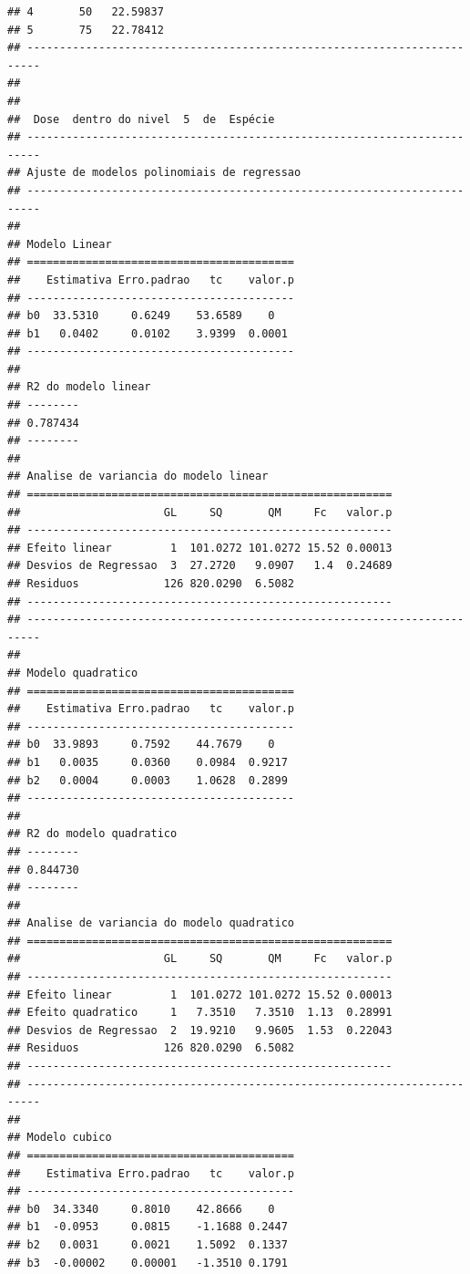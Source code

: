 \documentclass[
]{article}
\begin{document}
\begin{verbatim}
## 4       50   22.59837
## 5       75   22.78412
## ------------------------------------------------------------------------
## 
## 
##  Dose  dentro do nivel  5  de  Espécie 
## ------------------------------------------------------------------------
## Ajuste de modelos polinomiais de regressao
## ------------------------------------------------------------------------
## 
## Modelo Linear
## =========================================
##    Estimativa Erro.padrao   tc    valor.p
## -----------------------------------------
## b0  33.5310     0.6249    53.6589    0   
## b1   0.0402     0.0102    3.9399  0.0001 
## -----------------------------------------
## 
## R2 do modelo linear
## --------
## 0.787434
## --------
## 
## Analise de variancia do modelo linear
## ========================================================
##                      GL     SQ       QM     Fc   valor.p
## --------------------------------------------------------
## Efeito linear         1  101.0272 101.0272 15.52 0.00013
## Desvios de Regressao  3  27.2720   9.0907   1.4  0.24689
## Residuos             126 820.0290  6.5082               
## --------------------------------------------------------
## ------------------------------------------------------------------------
## 
## Modelo quadratico
## =========================================
##    Estimativa Erro.padrao   tc    valor.p
## -----------------------------------------
## b0  33.9893     0.7592    44.7679    0   
## b1   0.0035     0.0360    0.0984  0.9217 
## b2   0.0004     0.0003    1.0628  0.2899 
## -----------------------------------------
## 
## R2 do modelo quadratico
## --------
## 0.844730
## --------
## 
## Analise de variancia do modelo quadratico
## ========================================================
##                      GL     SQ       QM     Fc   valor.p
## --------------------------------------------------------
## Efeito linear         1  101.0272 101.0272 15.52 0.00013
## Efeito quadratico     1   7.3510   7.3510  1.13  0.28991
## Desvios de Regressao  2  19.9210   9.9605  1.53  0.22043
## Residuos             126 820.0290  6.5082               
## --------------------------------------------------------
## ------------------------------------------------------------------------
## 
## Modelo cubico
## =========================================
##    Estimativa Erro.padrao   tc    valor.p
## -----------------------------------------
## b0  34.3340     0.8010    42.8666    0   
## b1  -0.0953     0.0815    -1.1688 0.2447 
## b2   0.0031     0.0021    1.5092  0.1337 
## b3  -0.00002    0.00001   -1.3510 0.1791 

\end{verbatim}
\end{document}
